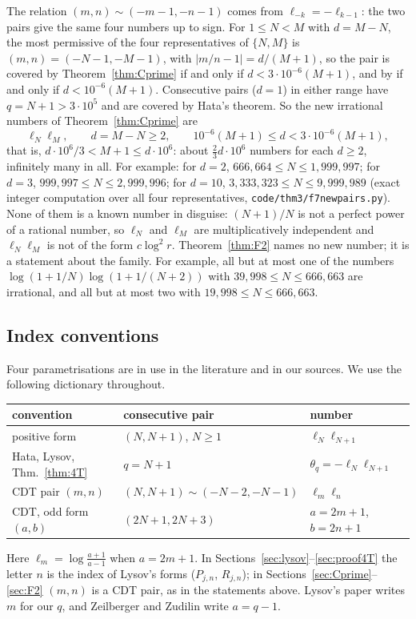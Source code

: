\documentclass[11pt]{amsart}
\theoremstyle{definition}
\theoremstyle{remark}
\numberwithin{equation}{section}
\newcommand{\file}[1]{{\def\_{\textunderscore\allowbreak}\texttt{#1}}}
\begin{document}
The relation $(m,n)\sim(-m-1,-n-1)$ comes from $\ell_{-k}=-\ell_{k-1}$: the two pairs give the same four numbers up to
sign. For $1\le N<M$ with $d=M-N$, the most permissive of the four representatives of $\{N,M\}$ is
$(m,n)=(-N-1,-M-1)$, with $|m/n-1|=d/(M+1)$, so
the pair is covered by Theorem~\ref{thm:Cprime} if and only if $d<3\cdot10^{-6}(M+1)$, and by \cite[Thm.~C]{CDT} if and
only if $d<10^{-6}(M+1)$. Consecutive pairs ($d=1$) in either range have $q=N+1>3\cdot10^5$ and are covered by Hata's
theorem. So the new irrational numbers of Theorem~\ref{thm:Cprime} are
\begin{equation}\label{eq:newpairs}
\ell_N\ell_M,\qquad d=M-N\ge2,\qquad 10^{-6}(M+1)\le d<3\cdot10^{-6}(M+1),
\end{equation}
that is, $d\cdot10^6/3<M+1\le d\cdot10^6$: about $\frac23d\cdot10^6$ numbers for each $d\ge2$, infinitely many in all.
For example: for $d=2$, $666{,}664\le N\le1{,}999{,}997$; for $d=3$, $999{,}997\le N\le2{,}999{,}996$; for $d=10$,
$3{,}333{,}323\le N\le9{,}999{,}989$ (exact integer computation over all four representatives,
\file{code/thm3/f7\_newpairs.py}). None of them is a known number in disguise: $(N+1)/N$ is not a perfect power of a
rational number, so $\ell_N$ and $\ell_M$ are multiplicatively independent and $\ell_N\ell_M$ is not of the form
$c\log^2r$. Theorem~\ref{thm:F2} names no new number; it is a statement about the family. For example, all but at most
one of the numbers $\log(1+1/N)\log(1+1/(N+2))$ with $39{,}998\le N\le666{,}663$ are irrational, and all but at most two
with $19{,}998\le N\le666{,}663$.

\subsection{Index conventions}
Four parametrisations are in use in the literature and in our sources. We use the following dictionary throughout.
\begin{center}
\small\setlength{\tabcolsep}{4pt}
\begin{tabular}{lll}
\toprule
convention & consecutive pair & number\\
\midrule
positive form & $(N,N+1)$, $N\ge1$ & $\ell_N\ell_{N+1}$\\
Hata, Lysov, Thm.~\ref{thm:4T} & $q=N+1$ & $\theta_q=-\ell_N\ell_{N+1}$\\
CDT pair $(m,n)$ & $(N,N+1)\sim(-N-2,-N-1)$ & $\ell_m\ell_n$\\
CDT, odd form $(a,b)$ & $(2N+1,2N+3)$ & $a=2m+1$, $b=2n+1$\\
\bottomrule
\end{tabular}
\end{center}
Here $\ell_m=\log\frac{a+1}{a-1}$ when $a=2m+1$.
In Sections~\ref{sec:lysov}--\ref{sec:proof4T} the letter $n$ is the index of Lysov's forms ($P_{j,n}$, $R_{j,n}$);
in Sections~\ref{sec:Cprime}--\ref{sec:F2} $(m,n)$ is a CDT pair, as in the statements above. Lysov's paper writes
$m$ for our $q$, and Zeilberger and Zudilin \cite{ZZ19} write $a=q-1$.
\end{document}
